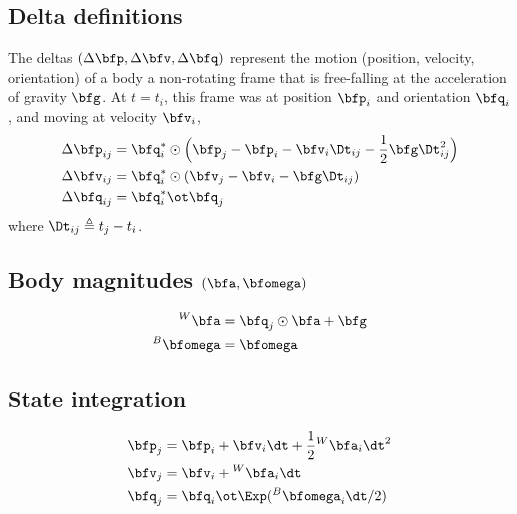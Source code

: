 \subsection{Delta definitions}

The deltas $(\Dp,\Dv,\Dq)$ represent the motion (position, velocity, orientation) of a body \wrt a non-rotating frame that is free-falling at the acceleration of gravity $\bfg$. At $t=t_i$, this frame was at position $\bfp_i$ and orientation $\bfq_i$, and moving at velocity $\bfv_i$,
%
\begin{align}
\begin{split}
\Dp_{ij} &= \bfq_i^*\od\Big(\bfp_j - \bfp_i - \bfv_i\Dt_{ij} - \frac12\bfg\Dt_{ij}^2\Big) \\
\Dv_{ij} &= \bfq_i^*\od(\bfv_j - \bfv_i - \bfg\Dt_{ij}) \\
\Dq_{ij} &= \bfq_i^*\ot\bfq_j 
\end{split}
\end{align}
%
where $\Dt_{ij} \te t_j - t_i$.

\subsection{Body magnitudes $(\bfa,\bw)$}%

\begin{align}
\begin{split}
{}^W\bfa &= \bfq_j\od\bfa + \bfg \\
{}^B\bw &= \bw
\end{split}
\end{align}



\subsection{State integration}

\begin{align}\label{equ:g_second_order_integration}
\begin{split}
\bfp_{j} &= \bfp_i + \bfv_i\dt  + \frac12{}^W\bfa_i\dt^2 \\
\bfv_{j} &= \bfv_i + {}^W\bfa_i\dt \\
\bfq_{j} &= \bfq_i\ot\Exp({}^B\bw_i\dt/2) 
\end{split}
\end{align}



